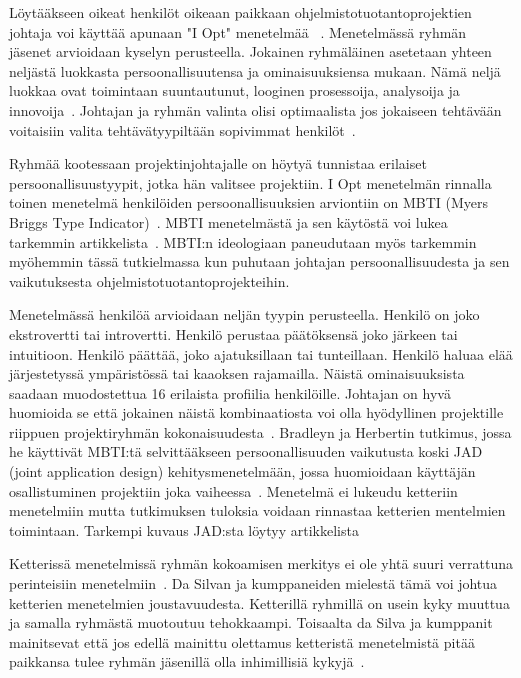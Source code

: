 \documentclass[finnish]{tktltiki2}
\theoremstyle{definition}
\theoremstyle{remark}
\begin{document}
Löytääkseen oikeat henkilöt oikeaan paikkaan ohjelmistotuotantoprojektien johtaja voi käyttää apunaan "I Opt" menetelmää ~\cite{Dhomne:2012:ITL:2382887.2382899, kliem1996teambuilding}. Menetelmässä ryhmän jäsenet arvioidaan kyselyn perusteella. Jokainen ryhmäläinen asetetaan yhteen neljästä luokkasta persoonallisuutensa ja ominaisuuksiensa mukaan. Nämä neljä luokkaa ovat toimintaan suuntautunut, looginen prosessoija, analysoija ja innovoija~\cite{ kliem1996teambuilding}. Johtajan ja ryhmän valinta olisi optimaalista jos jokaiseen tehtävään voitaisiin valita tehtävätyypiltään sopivimmat henkilöt~\cite{Dhomne:2012:ITL:2382887.2382899}.

Ryhmää kootessaan projektinjohtajalle on höytyä tunnistaa erilaiset persoonallisuustyypit, jotka hän valitsee projektiin. I Opt menetelmän rinnalla toinen menetelmä henkilöiden persoonallisuuksien arviontiin on MBTI (Myers Briggs Type Indicator)~\cite{bradley1997effect}. MBTI menetelmästä ja sen käytöstä voi lukea tarkemmin artikkelista~\cite{myers1985manual}. MBTI:n ideologiaan paneudutaan myös tarkemmin myöhemmin tässä tutkielmassa kun puhutaan johtajan persoonallisuudesta ja sen vaikutuksesta ohjelmistotuotantoprojekteihin.

Menetelmässä henkilöä arvioidaan neljän tyypin perusteella. Henkilö on joko ekstrovertti tai introvertti. Henkilö perustaa päätöksensä joko järkeen tai intuitioon. Henkilö päättää, joko ajatuksillaan tai tunteillaan. Henkilö haluaa elää järjestetyssä ympäristössä tai kaaoksen rajamailla. Näistä ominaisuuksista saadaan muodostettua 16 erilaista profiilia henkilöille. Johtajan on hyvä huomioida se että jokainen näistä kombinaatiosta voi olla hyödyllinen projektille riippuen projektiryhmän kokonaisuudesta~\cite{bradley1997effect}. Bradleyn ja Herbertin tutkimus, jossa he käyttivät MBTI:tä selvittääkseen persoonallisuuden vaikutusta koski JAD (joint application design) kehitysmenetelmään, jossa huomioidaan käyttäjän osallistuminen projektiin joka vaiheessa~\cite{bradley1997effect}. Menetelmä ei lukeudu ketteriin menetelmiin mutta tutkimuksen tuloksia voidaan rinnastaa ketterien mentelmien toimintaan. Tarkempi kuvaus JAD:sta löytyy artikkelista~\cite{Davidson1999215}

Ketterissä menetelmissä ryhmän kokoamisen merkitys ei ole yhtä suuri verrattuna perinteisiin menetelmiin~\cite{daSilva2012}. Da Silvan ja kumppaneiden mielestä tämä voi johtua ketterien menetelmien joustavuudesta. Ketterillä ryhmillä on usein kyky muuttua ja samalla ryhmästä muotoutuu tehokkaampi. Toisaalta da Silva ja kumppanit mainitsevat että jos edellä mainittu olettamus ketteristä menetelmistä pitää paikkansa tulee ryhmän jäsenillä olla inhimillisiä kykyjä~\cite{daSilva2012}.
\end{document}
